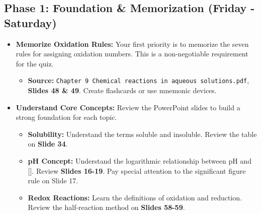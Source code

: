 \documentclass{article}
\begin{document}
\subsection*{Phase 1: Foundation \& Memorization (Friday - Saturday)}
\begin{itemize}[itemsep=5pt]
    \item \textbf{Memorize Oxidation Rules:} Your first priority is to memorize the seven rules for assigning oxidation numbers. This is a non-negotiable requirement for the quiz.
    \begin{itemize}
        \item \textbf{Source:} \texttt{Chapter 9 Chemical reactions in aqueous solutions.pdf}, \textbf{Slides 48 \& 49}. Create flashcards or use mnemonic devices.
    \end{itemize}
    \item \textbf{Understand Core Concepts:} Review the PowerPoint slides to build a strong foundation for each topic.
    \begin{itemize}
        \item \textbf{Solubility:} Understand the terms soluble and insoluble. Review the table on \textbf{Slide 34}.
        \item \textbf{pH Concept:} Understand the logarithmic relationship between pH and []. Review \textbf{Slides 16-19}. Pay special attention to the significant figure rule on Slide 17.
        \item \textbf{Redox Reactions:} Learn the definitions of oxidation and reduction. Review the half-reaction method on \textbf{Slides 58-59}.
    \end{itemize}
\end{itemize}
\end{document}

